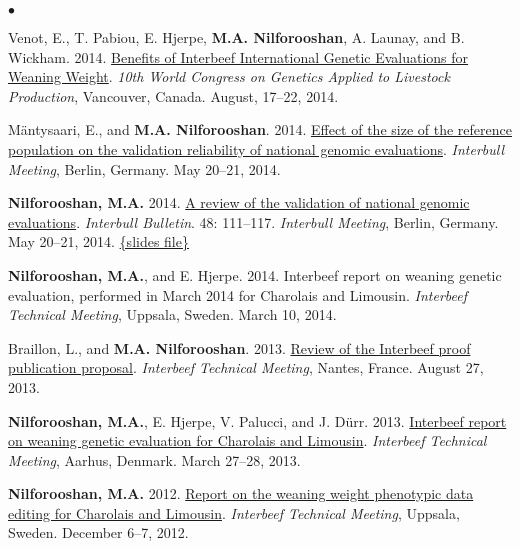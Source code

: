 \documentclass[margin,line]{res}
\newenvironment{list2}{
  \begin{list}{$\bullet$}{%
      \setlength{\itemsep}{0in}
      \setlength{\parsep}{0in} \setlength{\parskip}{0in}
      \setlength{\topsep}{0in} \setlength{\partopsep}{0in}
      \setlength{\leftmargin}{0.2in}}}{\end{list}}
\begin{document}
\begin{resume}
\begin{list2}
    \item Venot, E., T. Pabiou, E. Hjerpe, {\bf M.A. Nilforooshan}, A. Launay, and B. Wickham. 2014. \href{https://www.researchgate.net/publication/268109933_Benefits_of_Interbeef_international_genetic_evaluations_for_weaning_weight}{Benefits of Interbeef International Genetic Evaluations for Weaning Weight}. {\em 10th World Congress on Genetics Applied to Livestock Production}, Vancouver, Canada. August, 17--22, 2014.
    \item M\"{a}ntysaari, E., and {\bf M.A. Nilforooshan}. 2014. \href{https://drive.google.com/file/d/0B2l_izQwJmVpY3B1dTRtMmlWV1E/view?usp=sharing&resourcekey=0-noBm5g1J1txJWu7nFhvD1A}{Effect of the size of the reference population on the validation reliability of national genomic evaluations}. {\em Interbull Meeting}, Berlin, Germany. May 20--21, 2014.
    \item {\bf Nilforooshan, M.A.} 2014. \href{https://www.researchgate.net/publication/358198989_A_Review_of_the_Validation_of_National_Genomic_Evaluations}{A review of the validation of national genomic evaluations}. {\em Interbull Bulletin}. 48: 111--117. {\em Interbull Meeting}, Berlin, Germany. May 20--21, 2014. \href{https://drive.google.com/file/d/0B2l_izQwJmVpdmxrUjF5WGc1X3c/view?usp=sharing&resourcekey=0-OBCPGDhhf3PpkbQL_lwMXg}{\{slides file\}}
    \item {\bf Nilforooshan, M.A.}, and E. Hjerpe. 2014. Interbeef report on weaning genetic evaluation, performed in March 2014 for Charolais and Limousin. {\em Interbeef Technical Meeting}, Uppsala, Sweden. March 10, 2014.
    \item Braillon, L., and {\bf M.A. Nilforooshan}. 2013. \href{https://drive.google.com/file/d/0B2l_izQwJmVpYWE2VndwNGhJblU/view?usp=sharing&resourcekey=0-lK2OKh6je4O4Dz_z0I9jJg}{Review of the Interbeef proof publication proposal}. {\em Interbeef Technical Meeting}, Nantes, France. August 27, 2013.
    \item {\bf Nilforooshan, M.A.}, E. Hjerpe, V. Palucci, and J. D\"{u}rr. 2013. \href{https://drive.google.com/file/d/0B2l_izQwJmVpZ2RRcXc0bS11RmM/view?usp=sharing&resourcekey=0-mJU9o7o9WqG3XXCrFYq9Xw}{Interbeef report on weaning genetic evaluation for Charolais and Limousin}. {\em Interbeef Technical Meeting}, Aarhus, Denmark. March 27--28, 2013.
    \item {\bf Nilforooshan, M.A.} 2012. \href{https://drive.google.com/file/d/0B2l_izQwJmVpLVY5NU1UZGR6czA/view?usp=sharing&resourcekey=0-z2Uuf8hnh-P_CXmZJ6iNXw}{Report on the weaning weight phenotypic data editing for Charolais and Limousin}. {\em Interbeef Technical Meeting}, Uppsala, Sweden. December 6--7, 2012.

\end{list2}
\end{resume}
\end{document}
